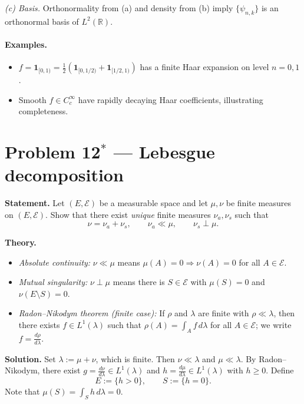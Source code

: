\documentclass[12pt,a4paper]{article}
\theoremstyle{plain}
\theoremstyle{definition}
\theoremstyle{remark}
\theoremstyle{remark}
\theoremstyle{definition}
\begin{document}
\smallskip
\emph{(c) Basis.} Orthonormality from (a) and density from (b) imply $\{\psi_{n,k}\}$ is an orthonormal basis of $L^2(\mathbb{R})$.

\paragraph{Examples.}
\begin{itemize}\itemsep2pt
	\item $f=\mathbf 1_{[0,1)}=\tfrac12(\mathbf 1_{[0,1/2)}+\mathbf 1_{[1/2,1)})$ has a finite Haar expansion on level $n=0,1$.
	\item Smooth $f\in C_c^\infty$ have rapidly decaying Haar coefficients, illustrating completeness.
\end{itemize}

	\section*{Problem 12$^{\ast}$ — Lebesgue decomposition}
	
	\textbf{Statement.}
	Let $(E,\mathcal{E})$ be a measurable space and let $\mu,\nu$ be finite measures on $(E,\mathcal{E})$.
	Show that there exist \emph{unique} finite measures $\nu_a,\nu_s$ such that
	\[
	\nu=\nu_a+\nu_s,\qquad \nu_a\ll \mu,\qquad \nu_s\perp \mu.
	\]
	
	\bigskip
	
	\textbf{Theory.}
	\begin{itemize}
		\item \emph{Absolute continuity:} $\nu\ll\mu$ means $\mu(A)=0 \Rightarrow \nu(A)=0$ for all $A\in\mathcal E$.
		\item \emph{Mutual singularity:} $\nu\perp\mu$ means there is $S\in\mathcal E$ with $\mu(S)=0$ and $\nu(E\setminus S)=0$.
		\item \emph{Radon--Nikodym theorem (finite case):}
		If $\rho$ and $\lambda$ are finite with $\rho\ll\lambda$, then there exists $f\in L^1(\lambda)$ such that
		$\rho(A)=\int_A f\,d\lambda$ for all $A\in\mathcal E$; we write $f=\frac{d\rho}{d\lambda}$.
	\end{itemize}
	
	\bigskip
	
	\textbf{Solution.}
	Set $\lambda:=\mu+\nu$, which is finite. Then $\nu\ll\lambda$ and $\mu\ll\lambda$.
	By Radon--Nikodym, there exist $g=\frac{d\nu}{d\lambda}\in L^1(\lambda)$ and
	$h=\frac{d\mu}{d\lambda}\in L^1(\lambda)$ with $h\ge 0$.
	Define
	\[
	E:=\{h>0\},\qquad S:=\{h=0\}.
	\]
	Note that $\mu(S)=\int_S h\,d\lambda=0$.
	
\end{document}
